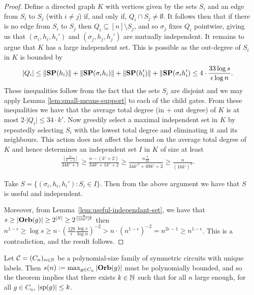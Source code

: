 \documentclass[../main/thesis.tex]{subfiles}
\begin{document}
\begin{proof}
  Define a directed graph $K$ with vertices given by the sets $S_i$ and an edge
  from $S_i$ to $S_j$ (with $i \neq j$) if, and only if, $Q_i \cap S_j \neq
  \emptyset$. It follows then that if there is no edge from $S_i$ to $S_j$ then
  $Q_i \subseteq [n]\setminus S_j$, and so $\sigma_j$ fixes $Q_i$ pointwise,
  giving us that $(\sigma_i, h_i, h_i')$ and $(\sigma_j, h_j, h_j')$ are
  mutually independent. It remains to argue that $K$ has a large independent
  set. This is possible as the out-degree of $S_i$ in $K$ is bounded by
  \begin{align*}
    \vert Q_i \vert \leq \|\text{\textbf{SP}}(h_i) \| + \|\text{\textbf{SP}}(\sigma_i h_i) \| + \|\text{\textbf{SP}}(h_i') \| + \|\text{\textbf{SP}}(\sigma_i h_i') \leq 4 \cdot \frac{33\log s}{\epsilon \log n}.
  \end{align*}
  These inequalities follow from the fact that the sets $S_i$ are disjoint and
  we may apply Lemma \ref{lem:small-means-support} to each of the child gates.
  From these inequalities we have that the average total degree (in + out
  degree) of $K$ is at most $2 \cdot \vert Q_i \vert \leq 34 \cdot k'$. Now
  greedily select a maximal independent set in $K$ by repeatedly selecting $S_i$
  with the lowest total degree and eliminating it and its neighbours. This
  action does not affect the bound on the average total degree of $K$ and hence
  determines an independent set $I$ in $K$ of size at least
  \begin{align*}
    \frac{\lfloor \frac{n}{k' + 2} \rfloor}{34k' + 1} \geq \frac{n - (k'+2)}{34k'+1k'+2} \geq \frac{n\frac{7}{16}}{34k'^2 + 69k' +2} \geq \frac{n}{(16k')^2}.
  \end{align*}

  Take $S = \{(\sigma_i, h_i, h_i') : S_i \in I \}$. Then from the above
  argument we have that $S$ is useful and independent.
  
  Moreover, from Lemma~\ref{lem:useful-independant-set}, we have that $s \geq
  \vert \text{\textbf{Orb}}(g) \vert \geq 2^{\vert S \vert} \geq 2^{\frac{n}{(16k')^2}}$ then
  $n^{1-\epsilon} \geq \log s \geq n \cdot (\frac{128}{\epsilon}\frac{\log
    s}{\log n})^{-2} > n \cdot (n^{1-\epsilon})^{-2} = n^{2\epsilon -1} \geq
  n^{1-\epsilon}$. This is a contradiction, and the result follows.
\end{proof}
 
Let $\mathcal{C} = (C_n)_{n \in \mathbb{N}}$ be a polynomial-size family of symmetric
circuits with unique labels. Then $s(n) := \max_{g \in C_n} \vert \text{\textbf{Orb}} (g)\vert$
must be polynomially bounded, and so the theorem implies that there exists $k
\in \mathbb{N}$ such that for all $n$ large enough, for all $g \in C_n$, $\vert
\text{sp}(g) \vert \leq k$.
\end{document}
